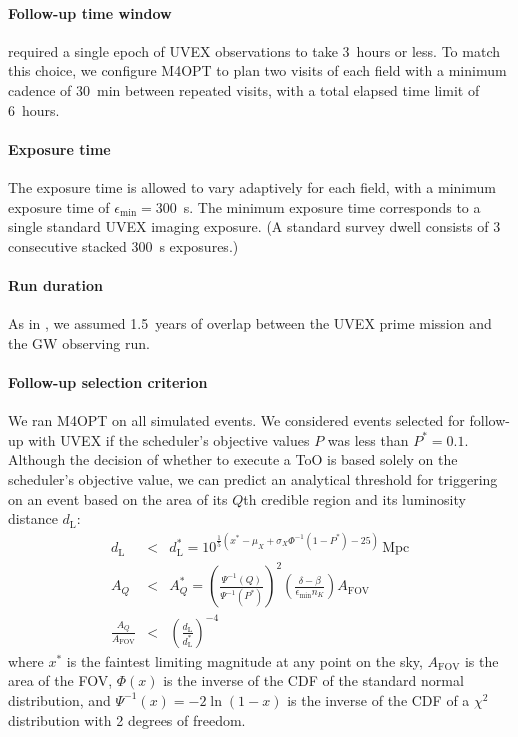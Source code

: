 \documentclass[twocolumn,times]{aastex631}
\begin{document}
\paragraph{Follow-up time window}
\citet{criswell} required a single epoch of \ac{UVEX} observations to take 3~hours or less. To match this choice, we configure \ac{M4OPT} to plan two visits of each field with a minimum cadence of 30~min between repeated visits, with a total elapsed time limit of 6~hours. 

\paragraph{Exposure time}
The exposure time is allowed to vary adaptively for each field, with a minimum exposure time of $\epsilon_\mathrm{min} = 300$~s. The minimum exposure time corresponds to a single standard \ac{UVEX} imaging exposure. (A standard survey dwell consists of 3 consecutive stacked 300~s exposures.)

\paragraph{Run duration}
As in \citet{criswell}, we assumed 1.5~years of overlap between the \ac{UVEX} prime mission and the \ac{GW} observing run.

\paragraph{Follow-up selection criterion}
We ran \ac{M4OPT} on all simulated events. We considered events selected for follow-up with \ac{UVEX} if the scheduler's objective values $P$ was less than $P^* = 0.1$. Although the decision of whether to execute a \ac{ToO} is based solely on the scheduler's objective value, we can predict an analytical threshold for triggering on an event based on the area of its $Q$th credible region and its luminosity distance $d_\mathrm{L}$:
%
\begin{eqnarray}
    d_\mathrm{L} &<& d_\mathrm{L}^* = 10^{\frac{1}{5}(x^* - \mu_X + \sigma_X \Phi^{-1}(1-P^*) - 25)}\,\mathrm{Mpc} \label{eq:threshold-distance} \\
    A_Q &<& A_Q^* = \left(\frac{\Psi^{-1}(Q)}{\Psi^{-1}(P^*)}\right)^2 \left(\frac{\delta - \beta}{\epsilon_\mathrm{min} n_K}\right)A_\mathrm{FOV} \label{eq:threshold-area} \\
    \frac{A_Q}{A_\mathrm{FOV}} &<& \left(\frac{d_\mathrm{L}}{d_\mathrm{L}^*}\right)^{-4} \label{eq:threshold-area-distance}
\end{eqnarray}
%
where $x^*$ is the faintest limiting magnitude at any point on the sky, $A_\mathrm{FOV}$ is the area of the \ac{FOV}, $\Phi(x)$ is the inverse of the \ac{CDF} of the standard normal distribution, and $\Psi^{-1}(x) = -2\ln(1 - x)$ is the inverse of the \ac{CDF} of a $\chi^2$ distribution with 2 degrees of freedom.
\end{document}

